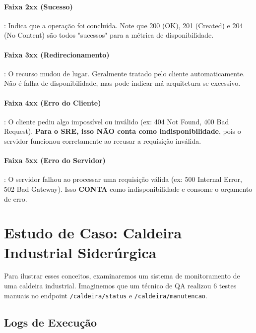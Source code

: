 \documentclass[12pt,a4paper]{report}
\begin{document}
\paragraph{Faixa 2xx (Sucesso)}: Indica que a operação foi concluída. Note que 200 (OK), 201 (Created) e 204 (No Content) são todos "sucessos" para a métrica de disponibilidade.

\paragraph{Faixa 3xx (Redirecionamento)}: O recurso mudou de lugar. Geralmente tratado pelo cliente automaticamente. Não é falha de disponibilidade, mas pode indicar má arquitetura se excessivo.

\paragraph{Faixa 4xx (Erro do Cliente)}: O cliente pediu algo impossível ou inválido (ex: 404 Not Found, 400 Bad Request). \textbf{Para o SRE, isso NÃO conta como indisponibilidade}, pois o servidor funcionou corretamente ao recusar a requisição inválida.

\paragraph{Faixa 5xx (Erro do Servidor)}: O servidor falhou ao processar uma requisição válida (ex: 500 Internal Error, 502 Bad Gateway). Isso \textbf{CONTA} como indisponibilidade e consome o orçamento de erro.

\section{Estudo de Caso: Caldeira Industrial Siderúrgica}

Para ilustrar esses conceitos, examinaremos um sistema de monitoramento de uma caldeira industrial. Imaginemos que um técnico de QA realizou 6 testes manuais no endpoint \texttt{/caldeira/status} e \texttt{/caldeira/manutencao}.

\subsection{Logs de Execução}
\end{document}
